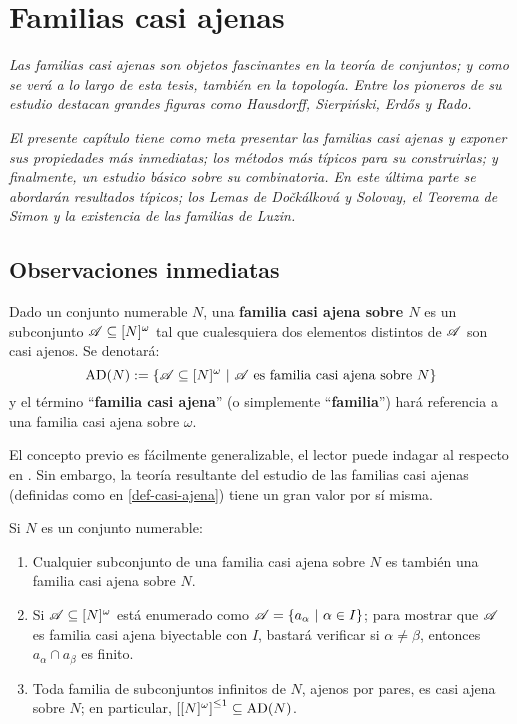 \chapter{Familias casi ajenas}
\emph{\small Las familias casi ajenas son objetos fascinantes en la teoría de conjuntos; y como se verá a lo largo de esta tesis, también en la topología. Entre los pioneros de su estudio destacan grandes figuras como Hausdorff, Sierpiński, Erdős y Rado.}

\emph{\small El presente capítulo tiene como meta presentar las familias casi ajenas y exponer sus propiedades más inmediatas; los métodos más típicos para su construirlas; y finalmente, un estudio  básico sobre su combinatoria. En este última parte se abordarán resultados típicos; los Lemas de Dočkálková y Solovay, el Teorema de Simon y la existencia de las familias de Luzin.}

\section{Observaciones inmediatas}

\begin{definicion}\label{def-casi-ajena}
	Dado un conjunto numerable $N$, una \textbf{familia casi ajena sobre $N$} es un subconjunto $\mathscr{A}\subseteq[N]^\omega$ tal que cualesquiera dos elementos distintos de $\mathscr{A}$ son casi ajenos. Se denotará:
	$$ \operatorname{AD}(N):=\{ \mathscr{A} \subseteq [N]^\omega \text{ $|$ } \mathscr{A} \text{ es familia casi ajena sobre } N \} $$
	y el término ``\textbf{familia casi ajena}'' (o simplemente ``\textbf{familia}'') hará referencia a una familia casi ajena sobre $\omega$.
\end{definicion}

El concepto previo es fácilmente generalizable, el lector puede indagar al respecto en \cite[Def.~9.20, p.~118]{jechSet}. Sin embargo, la teoría resultante del estudio de las familias casi ajenas (definidas como en \ref{def-casi-ajena}) tiene un gran valor por sí misma.

\begin{observacion}
	Si $N$ es un conjunto numerable:
	\begin{enumerate}
		\item Cualquier subconjunto de una familia casi ajena sobre $N$ es también una familia casi ajena sobre $N$.
		\item Si $\mathscr{A} \subseteq [N]^\omega$ está enumerado como $\mathscr{A} =\{ a_\alpha \text{ $|$ } \alpha \in I \}$; para mostrar que $\mathscr{A}$ es familia casi ajena biyectable con $I$, bastará verificar si $\alpha \neq \beta$, entonces $a_\alpha \cap a_\beta$ es finito.
		\item Toda familia de subconjuntos infinitos de $N$, ajenos por pares, es casi ajena sobre $N$; en particular, $\left[ [N]^\omega \right]^{\leq 1} \subseteq \operatorname{AD}(N)$.
	\end{enumerate}
\end{observacion}

